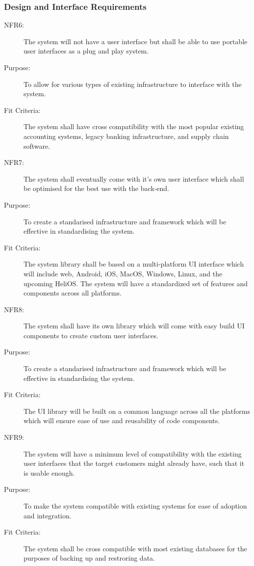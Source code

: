 \documentclass[a4paper,twoside,phd]{BYUPhys}
\begin{document}
\subsubsection{Design and Interface Requirements}
\begin{description}
\item[NFR6:] The system will not have a user interface but shall be able to use portable user interfaces as a plug and play system.
\item[Purpose:] To allow for various types of existing infrastructure to interface with the system.
\item[Fit Criteria:] The system shall have cross compatibility with the most popular existing accounting systems, legacy banking infrastructure, and supply chain software.
\item[NFR7:] The system shall eventually come with it’s own user interface which shall be optimised for the best use with the back-end.
\item[Purpose:] To create a standarised infrastructure and framework which will be effective in standardising the system.
\item[Fit Criteria:] The system library shall be based on a multi-platform UI interface which will include web, Android, iOS, MacOS, Windows, Linux, and the upcoming HeliOS. The system will have a standardized set of features and components across all platforms. 
\item[NFR8:] The system shall have its own library which will come with easy build UI components to create custom user interfaces.
\item[Purpose:] To create a standarised infrastructure and framework which will be effective in standardising the system.
\item[Fit Criteria:] The UI library will be built on a common language across all the platforms which will ensure ease of use and reusability of code components.
\item[NFR9:] The system will have a minimum level of compatibility with the existing user interfaces that the target customers might already have, such that it is usable enough.
\item[Purpose:] To make the system compatible with existing systems for ease of adoption and integration.
\item[Fit Criteria:] The system shall be cross compatible with most existing databases for the purposes of backing up and restroring data.
\end{description}
\end{document}
